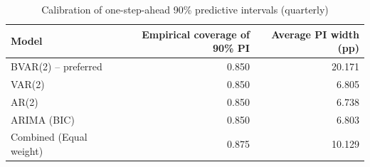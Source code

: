 \begin{table}

\caption{\label{tab:forecast-coverage}Calibration of one-step-ahead 90\% predictive intervals (quarterly)}
\centering
\begin{tabular}[t]{lrr}
\toprule
Model & Empirical coverage of 90\% PI & Average PI width (pp)\\
\midrule
BVAR(2) -- preferred & 0.850 & 20.171\\
VAR(2) & 0.850 & 6.805\\
AR(2) & 0.850 & 6.738\\
ARIMA (BIC) & 0.850 & 6.803\\
Combined (Equal weight) & 0.875 & 10.129\\
\bottomrule
\end{tabular}
\end{table}
